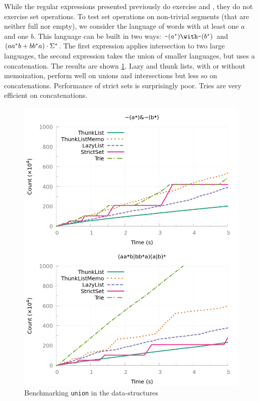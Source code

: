 While the regular expressions presented previously do exercise
 and , they do not exercise set
operations.  To test set operations on non-trivial segments (that are
neither full nor empty), we consider the language of words with at
least one $a$ and one $b$. This language can be built in two ways:
$\Rintersect{\Rcomplement{(\Rstar{a})}}{\Rcomplement{(\Rstar{b})}}$
and $(aa^*b +{bb^*a}) \cdot{\Sigma^*}$.
The first expression applies {intersection} to two large languages,
the second expression takes the union of smaller languages, but uses a
concatenation.  The results are shown \cref{bench:ocaml:union}.
Lazy and thunk lists, with or without
memoization, perform well on unions and intersections but less so
on concatenations. Performance of
strict sets is surprisingly poor.
Tries are very efficient on concatenations.

\begin{figure}[!t]
  \includegraphics[width=\linewidth]{measure/ocaml_union.png}
  \caption{Benchmarking \texttt{union} in the \ocaml data-structures}
  \label{bench:ocaml:union}
\end{figure}


